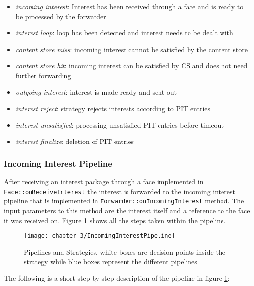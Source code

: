 \begin{itemize}
\item \emph{incoming interest}: Interest has been received through a face and is ready to be processed by the forwarder
\item \emph{interest loop}: loop has been detected and interest needs to be dealt with
\item \emph{content store miss}: incoming interest cannot be satisfied by the content store
\item \emph{content store hit}: incoming interest can be satisfied by CS and does not need further forwarding 
\item \emph{outgoing interest}: interest is made ready and sent out
\item \emph{interest reject}: strategy rejects interests according to PIT entries
\item \emph{interest unsatisfied}: processing unsatisfied PIT entries before timeout
\item \emph{interest finalize}: deletion of PIT entries
\end{itemize}

\subsubsection{Incoming Interest Pipeline}

After receiving an interest package through a face implemented in \texttt{Face::onReceiveInterest} the interest is forwarded to the incoming interest pipeline that is implemented in \texttt{Forwarder::onIncomingInterest} method. The input parameters to this method are the interest itself and a reference to the face it was received on. Figure \ref{fig:IncomingInterestPipeline} shows all the steps taken within the pipeline.

\begin{figure}[H]
  \centering
  \texttt{[image: chapter-3/IncomingInterestPipeline]}
  \caption{Pipelines and Strategies, white boxes are decision points inside the strategy while blue boxes represent the different pipelines \cite{Afanasyev16}}
  \label{fig:IncomingInterestPipeline}
\end{figure}

The following is a short step by step description of the pipeline in figure  \ref{fig:IncomingInterestPipeline}:

